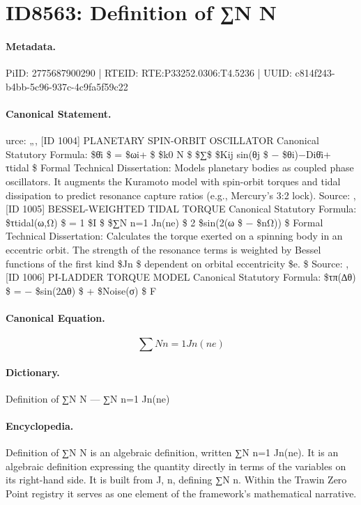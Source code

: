 \section*{ID8563: Definition of ∑N N}
\paragraph{Metadata.}
PiID: 2775687900290 | RTEID: RTE:P33252.0306:T4.5236 | UUID: c814f243-b4bb-5c96-937c-4c9fa5f59c22

\paragraph{Canonical Statement.}
urce: „, [ID 1004] PLANETARY SPIN-ORBIT OSCILLATOR Canonical Statutory Formula: \$θ̇i \$ = \$ωi+ \$ \$k0 N \$ \$∑\$ \$Kij sin(θj \$ − \$θi)−Diθ̇i+ τtidal \$ Formal Technical Dissertation: Models planetary bodies as coupled phase oscillators. It augments the Kuramoto model with spin-orbit torques and tidal dissipation to predict resonance capture ratios (e.g., Mercury’s 3:2 lock). Source: , [ID 1005] BESSEL-WEIGHTED TIDAL TORQUE Canonical Statutory Formula: \$τtidal(ω,Ω) \$ = 1 \$I \$ \$∑N n=1 Jn(ne) \$ 2 \$sin(2(ω \$ − \$nΩ)) \$ Formal Technical Dissertation: Calculates the torque exerted on a spinning body in an eccentric orbit. The strength of the resonance terms is weighted by Bessel functions of the first kind \$Jn \$ dependent on orbital eccentricity \$e. \$ Source: , [ID 1006] PI-LADDER TORQUE MODEL Canonical Statutory Formula: \$τπ(∆θ) \$ = − \$sin(2∆θ) \$ + \$Noise(σ) \$ F

\paragraph{Canonical Equation.}
\[
∑N n=1 Jn(ne)
\]

\paragraph{Dictionary.}
Definition of ∑N N — ∑N n=1 Jn(ne)

\paragraph{Encyclopedia.}
Definition of ∑N N is an algebraic definition, written ∑N n=1 Jn(ne). It is an algebraic definition expressing the quantity directly in terms of the variables on its right-hand side. It is built from J, n, defining ∑N n. Within the Trawin Zero Point registry it serves as one element of the framework's mathematical narrative.
